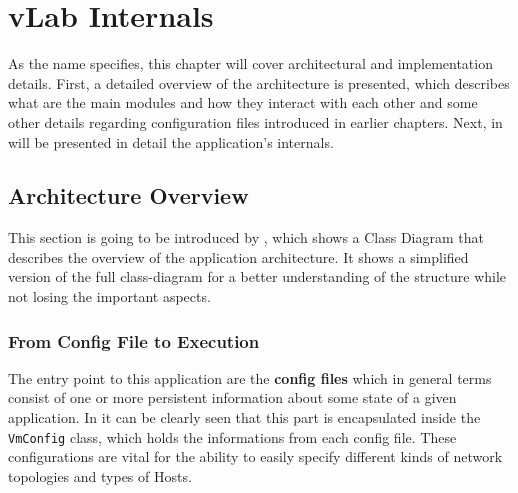 \chapter{vLab Internals}
\label{chapter:Chapter 4}

As the name specifies, this chapter will cover architectural and implementation details.
First, a detailed overview of the architecture is presented, which describes what are the main modules and how they interact with each other and some other details regarding configuration files introduced in earlier chapters.
Next, in  will be presented in detail the application's internals.

\section{Architecture Overview}
\label{sec:arh-overview}


This section is going to be introduced by , which shows a Class Diagram that describes the overview of the application architecture.
It shows a simplified version of the full class-diagram for a better understanding of the structure while not losing the important aspects.


\subsection{From Config File to Execution}
\label{sub-sec:arh-config-to-exec}

The entry point to this application are the \textbf{config files} which in general terms consist of one or more persistent information about some state of a given application.
In  it can be clearly seen that this part is encapsulated inside the \texttt{VmConfig} class, which holds the informations from each config file.
These configurations are vital for the ability to easily specify different kinds of network topologies and types of Hosts.

